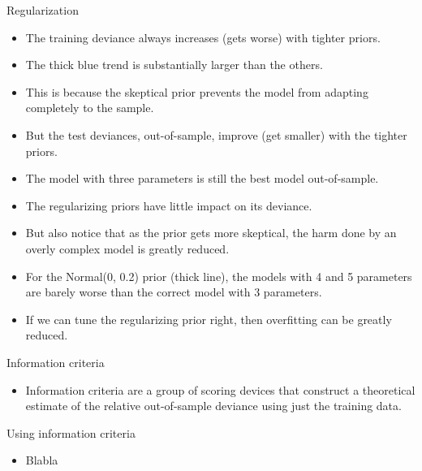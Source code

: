 \documentclass[handout]{beamer}
\begin{document}
\begin{frame}{Regularization}
\scriptsize{


\begin{itemize}

\item The training deviance always increases (gets worse) with tighter priors. 
\item The thick blue trend is substantially larger than the others.

\item This is because the skeptical prior prevents the model from adapting completely to the sample. 
\item But the test deviances, out-of-sample, improve (get smaller) with the tighter priors. 
\item The model with three parameters is still the best model out-of-sample.
\item The regularizing priors have little impact on its deviance.

\item But also notice that as the prior gets more skeptical, the harm done by an overly complex model is greatly reduced.
\item For the Normal(0, 0.2) prior (thick line), the models with 4 and 5 parameters are barely worse than the correct model with 3 parameters. 
\item If we can tune the
regularizing prior right, then overfitting can be greatly reduced.


\end{itemize}


} 
\end{frame}


\begin{frame}{Information criteria}
\scriptsize{

\begin{itemize}
\item Information criteria are a group of scoring devices that construct a theoretical estimate of the relative out-of-sample deviance using just the training data.
\end{itemize}


} 
\end{frame}


\begin{frame}{Using information criteria}
\scriptsize{

\begin{itemize}
\item Blabla
\end{itemize}


} 
\end{frame}
\end{document}
